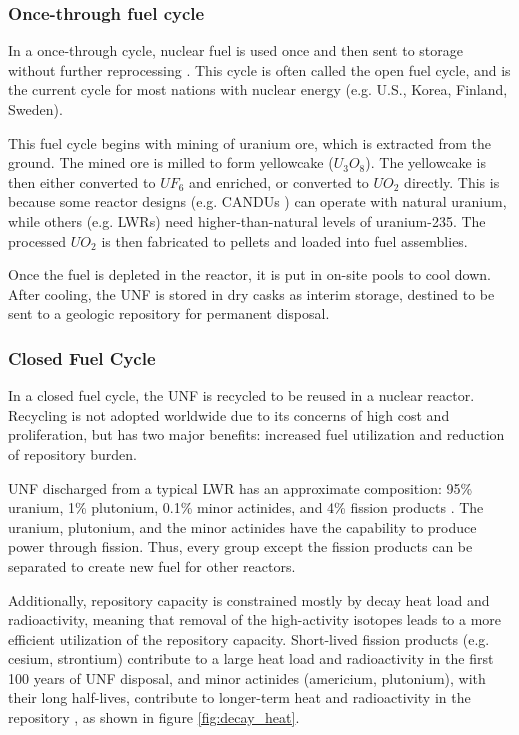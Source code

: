 \subsubsection{Once-through fuel cycle}

In a once-through cycle, nuclear fuel is used once and then sent to 
storage without further reprocessing \cite{tsoulfanidis_nuclear_2013}.
This cycle is often called the open fuel cycle, and is the current cycle for
most nations with nuclear energy (e.g. U.S., Korea, Finland, Sweden).

This fuel cycle begins with mining of uranium ore, which is extracted from the
ground. The mined ore is milled to form yellowcake ($U_3O_8$). 
The yellowcake is then either converted to $UF_6$ and enriched, or converted
to $UO_2$ directly. This is because some reactor designs (e.g. \glspl{CANDU} \cite{torgerson_candu_2006})
can operate with natural uranium, while others (e.g. \glspl{LWR}) need
higher-than-natural levels of uranium-235. The processed $UO_2$ is
then fabricated to pellets and loaded into fuel assemblies. 

Once the fuel is depleted in the reactor, it is put in on-site pools to cool down.
After cooling, the \gls{UNF}
is stored in dry casks as interim storage, destined to be sent to a geologic repository
for permanent disposal.

\subsubsection{Closed Fuel Cycle}
In a closed fuel cycle, the \gls{UNF} is recycled to be reused
in a nuclear reactor. Recycling is not adopted worldwide due to
its concerns of high cost and proliferation, but has two major
benefits: increased fuel utilization and reduction of repository
burden. 

\gls{UNF} discharged from a typical \gls{LWR} has an approximate
composition: 95\% uranium, 1\% plutonium, 0.1\%
minor actinides, and 4\% fission products \cite{feiveson_spent_2011}.
The uranium, plutonium, and the minor actinides have the capability
to produce power through fission. Thus, every group except the
fission products can be separated to create new fuel for other reactors.

Additionally, repository capacity is constrained mostly by decay heat
load and radioactivity, meaning that removal of the high-activity
isotopes leads to a more efficient utilization of the repository
capacity. Short-lived fission products (e.g. cesium, strontium) contribute
to a large heat load and radioactivity in the first 100 years of \gls{UNF} disposal,
and minor actinides (americium, plutonium), with their long half-lives,
contribute to longer-term heat and radioactivity in the repository \cite{wigeland_separations_2006},
as shown in figure \ref{fig:decay_heat}.


